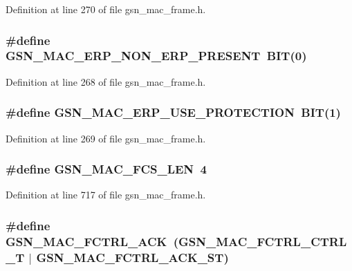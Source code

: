 Definition at line 270 of file gsn\_\-mac\_\-frame.h.

\hypertarget{a00523_a79cf26a78bdeea2cf1672f04d1be749b}{
\subsubsection[{GSN\_\-MAC\_\-ERP\_\-NON\_\-ERP\_\-PRESENT}]{\setlength{\rightskip}{0pt plus 5cm}\#define GSN\_\-MAC\_\-ERP\_\-NON\_\-ERP\_\-PRESENT~BIT(0)}}
\label{a00523_a79cf26a78bdeea2cf1672f04d1be749b}


Definition at line 268 of file gsn\_\-mac\_\-frame.h.

\hypertarget{a00523_ac713737cf4b06f4dfd02cf779ae1556e}{
\subsubsection[{GSN\_\-MAC\_\-ERP\_\-USE\_\-PROTECTION}]{\setlength{\rightskip}{0pt plus 5cm}\#define GSN\_\-MAC\_\-ERP\_\-USE\_\-PROTECTION~BIT(1)}}
\label{a00523_ac713737cf4b06f4dfd02cf779ae1556e}


Definition at line 269 of file gsn\_\-mac\_\-frame.h.

\hypertarget{a00523_a54e769a6cd33364460bdbfae522b30e6}{
\subsubsection[{GSN\_\-MAC\_\-FCS\_\-LEN}]{\setlength{\rightskip}{0pt plus 5cm}\#define GSN\_\-MAC\_\-FCS\_\-LEN~4}}
\label{a00523_a54e769a6cd33364460bdbfae522b30e6}


Definition at line 717 of file gsn\_\-mac\_\-frame.h.

\hypertarget{a00523_aad493db6e34af587bb101e7e9a5439eb}{
\subsubsection[{GSN\_\-MAC\_\-FCTRL\_\-ACK}]{\setlength{\rightskip}{0pt plus 5cm}\#define GSN\_\-MAC\_\-FCTRL\_\-ACK~(GSN\_\-MAC\_\-FCTRL\_\-CTRL\_\-T    $|$ GSN\_\-MAC\_\-FCTRL\_\-ACK\_\-ST)}}
\label{a00523_aad493db6e34af587bb101e7e9a5439eb}


